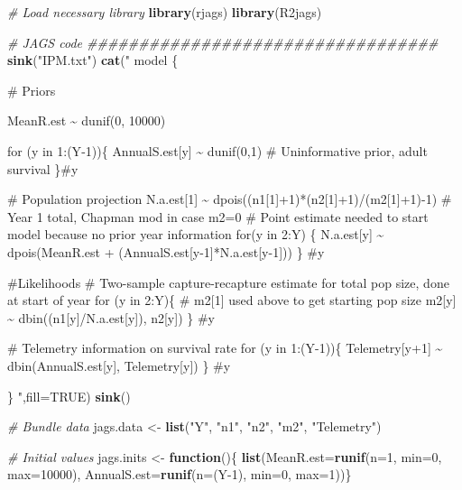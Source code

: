 \documentclass[
]{krantz}
\makeatletter
\newenvironment{Shaded}{\begin{snugshade}}{\end{snugshade}}
\newcommand{\AttributeTok}[1]{\textcolor[rgb]{0.27,0.27,0.27}{#1}}
\newcommand{\CommentTok}[1]{\textcolor[rgb]{0.37,0.37,0.37}{\textit{#1}}}
\newcommand{\ConstantTok}[1]{\textcolor[rgb]{0.37,0.37,0.37}{#1}}
\newcommand{\ControlFlowTok}[1]{\textcolor[rgb]{0.27,0.27,0.27}{\textbf{#1}}}
\newcommand{\DecValTok}[1]{\textcolor[rgb]{0.06,0.06,0.06}{#1}}
\newcommand{\FunctionTok}[1]{\textcolor[rgb]{0.27,0.27,0.27}{\textbf{#1}}}
\newcommand{\NormalTok}[1]{#1}
\newcommand{\OtherTok}[1]{\textcolor[rgb]{0.37,0.37,0.37}{#1}}
\newcommand{\StringTok}[1]{\textcolor[rgb]{0.5,0.5,0.5}{#1}}
\newenvironment{kframe}{%
\medskip{}
\setlength{\fboxsep}{.8em}
 \def\at@end@of@kframe{}%
 \ifinner\ifhmode%
  \def\at@end@of@kframe{\end{minipage}}%
  \begin{minipage}{\columnwidth}%
 \fi\fi%
 \def\FrameCommand##1{\hskip\@totalleftmargin \hskip-\fboxsep
 \colorbox{shadecolor}{##1}\hskip-\fboxsep
     \hskip-\linewidth \hskip-\@totalleftmargin \hskip\columnwidth}%
 \MakeFramed {\advance\hsize-\width
   \@totalleftmargin\z@ \linewidth\hsize
   \@setminipage}}%
 {\par\unskip\endMakeFramed%
 \at@end@of@kframe}
\renewenvironment{Shaded}{\begin{kframe}}{\end{kframe}}
\makeatother
\begin{document}
\begin{Shaded}
\begin{Highlighting}[]
\CommentTok{\# Load necessary library}
\FunctionTok{library}\NormalTok{(rjags)}
\FunctionTok{library}\NormalTok{(R2jags)}

\CommentTok{\# JAGS code \#\#\#\#\#\#\#\#\#\#\#\#\#\#\#\#\#\#\#\#\#\#\#\#\#\#\#\#\#\#\#\#\#\#}
\FunctionTok{sink}\NormalTok{(}\StringTok{"IPM.txt"}\NormalTok{)}
\FunctionTok{cat}\NormalTok{(}\StringTok{"}
\StringTok{model \{}

\StringTok{\# Priors}

\StringTok{ MeanR.est \textasciitilde{} dunif(0, 10000)}

\StringTok{for (y in 1:(Y{-}1))\{}
\StringTok{  AnnualS.est[y] \textasciitilde{} dunif(0,1)  \# Uninformative prior, adult survival}
\StringTok{\}\#y}

\StringTok{\# Population projection}
\StringTok{ N.a.est[1] \textasciitilde{} dpois((n1[1]+1)*(n2[1]+1)/(m2[1]+1){-}1) \# Year 1 total, Chapman mod in case m2=0}
\StringTok{ \# Point estimate needed to start model because no prior year information}
\StringTok{ for(y in 2:Y) \{}
\StringTok{     N.a.est[y] \textasciitilde{} dpois(MeanR.est + (AnnualS.est[y{-}1]*N.a.est[y{-}1]))}
\StringTok{     \} \#y}

\StringTok{\#Likelihoods}
\StringTok{\# Two{-}sample capture{-}recapture estimate for total pop size, done at start of year}
\StringTok{  for (y in 2:Y)\{  \# m2[1] used above to get starting pop size}
\StringTok{    m2[y] \textasciitilde{} dbin((n1[y]/N.a.est[y]), n2[y])}
\StringTok{    \} \#y}

\StringTok{\# Telemetry information on survival rate}
\StringTok{     for (y in 1:(Y{-}1))\{}
\StringTok{    Telemetry[y+1] \textasciitilde{} dbin(AnnualS.est[y], Telemetry[y])}
\StringTok{    \} \#y}

\StringTok{\}}
\StringTok{    "}\NormalTok{,}\AttributeTok{fill=}\ConstantTok{TRUE}\NormalTok{)}
\FunctionTok{sink}\NormalTok{()}

\CommentTok{\# Bundle data}
\NormalTok{jags.data }\OtherTok{\textless{}{-}} \FunctionTok{list}\NormalTok{(}\StringTok{"Y"}\NormalTok{, }\StringTok{"n1"}\NormalTok{, }\StringTok{"n2"}\NormalTok{, }\StringTok{"m2"}\NormalTok{, }\StringTok{"Telemetry"}\NormalTok{)}

\CommentTok{\# Initial values}
\NormalTok{jags.inits }\OtherTok{\textless{}{-}} \ControlFlowTok{function}\NormalTok{()\{ }\FunctionTok{list}\NormalTok{(}\AttributeTok{MeanR.est=}\FunctionTok{runif}\NormalTok{(}\AttributeTok{n=}\DecValTok{1}\NormalTok{, }\AttributeTok{min=}\DecValTok{0}\NormalTok{, }\AttributeTok{max=}\DecValTok{10000}\NormalTok{),}
                               \AttributeTok{AnnualS.est=}\FunctionTok{runif}\NormalTok{(}\AttributeTok{n=}\NormalTok{(Y}\DecValTok{{-}1}\NormalTok{), }\AttributeTok{min=}\DecValTok{0}\NormalTok{, }\AttributeTok{max=}\DecValTok{1}\NormalTok{))\}}


\end{Highlighting}
\end{Shaded}
\end{document}
